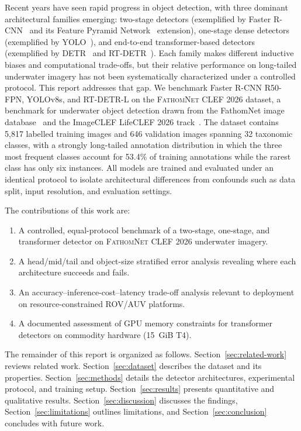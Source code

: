 \documentclass[11pt,a4paper]{article}
\newcommand{\dataset}{\textsc{FathomNet CLEF 2026}}
\begin{document}
Recent years have seen rapid progress in object detection, with three dominant architectural families emerging: two-stage detectors (exemplified by Faster R-CNN~\cite{fasterrcnn2015} and its Feature Pyramid Network~\cite{fpn2017} extension), one-stage dense detectors (exemplified by YOLO~\cite{yolov8_2023}), and end-to-end transformer-based detectors (exemplified by DETR~\cite{detr2020} and RT-DETR~\cite{rtdetr2024}). Each family makes different inductive biases and computational trade-offs, but their relative performance on long-tailed underwater imagery has not been systematically characterized under a controlled protocol.
This report addresses that gap. We benchmark Faster R-CNN R50-FPN, YOLOv8s, and RT-DETR-L on the \dataset{} dataset, a benchmark for underwater object detection drawn from the FathomNet image database~\cite{fathomnet2022} and the ImageCLEF LifeCLEF 2026 track~\cite{fathomnet-clef-2026}. The dataset contains 5,817 labelled training images and 646 validation images spanning 32 taxonomic classes, with a strongly long-tailed annotation distribution in which the three most frequent classes account for 53.4\% of training annotations while the rarest class has only six instances. All models are trained and evaluated under an identical protocol to isolate architectural differences from confounds such as data split, input resolution, and evaluation settings.

The contributions of this work are:
\begin{enumerate}[leftmargin=*]
  \item A controlled, equal-protocol benchmark of a two-stage, one-stage, and transformer detector on \dataset{} underwater imagery.
  \item A head/mid/tail and object-size stratified error analysis revealing where each architecture succeeds and fails.
  \item An accuracy--inference-cost--latency trade-off analysis relevant to deployment on resource-constrained ROV/AUV platforms.
  \item A documented assessment of GPU memory constraints for transformer detectors on commodity hardware (15~GiB T4).
\end{enumerate}

The remainder of this report is organized as follows. Section~\ref{sec:related-work} reviews related work. Section~\ref{sec:dataset} describes the dataset and its properties. Section~\ref{sec:methods} details the detector architectures, experimental protocol, and training setup. Section~\ref{sec:results} presents quantitative and qualitative results. Section~\ref{sec:discussion} discusses the findings, Section~\ref{sec:limitations} outlines limitations, and Section~\ref{sec:conclusion} concludes with future work.
\end{document}
